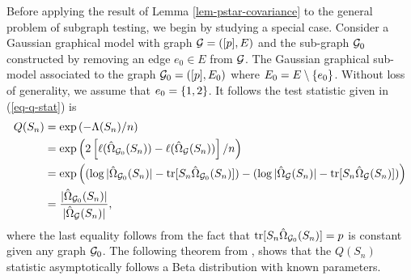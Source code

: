 Before applying the result of Lemma \ref{lem-pstar-covariance} to the general problem of subgraph testing, we begin by studying a special case. Consider a Gaussian graphical model with graph ${\mathcal{G}} = ([p], E)$ and the sub-graph ${\mathcal{G}}_0$ constructed by removing an edge $e_0 \in E$ from ${\mathcal{G}}$. The Gaussian graphical sub-model associated to the graph ${\mathcal{G}}_0 = ([p], E_0)$ where $E_0 = E \setminus {\left\{e_0\right\}}$. Without loss of generality, we assume that $e_0 = {\left\{1,2\right\}}$. It follows the test statistic given in (\ref{eq-q-stat}) is
\begin{align*}
    Q(S_n) 
    &= \exp\left(-\Lambda(S_n) / n\right)  \\
    &= \exp\left(2 \left[\ell(\hat\Omega_{{\mathcal{G}}_0}(S_n)) - \ell(\hat\Omega_{\mathcal{G}}(S_n))\right] / n\right) \\
    &= \exp\left(
        (\log |\hat\Omega_{{\mathcal{G}}_0}(S_n)| - {\textrm{tr}}[S_n\hat\Omega_{{\mathcal{G}}_0}(S_n)])
        -    
        (\log |\hat\Omega_{\mathcal{G}}(S_n)| - {\textrm{tr}}[S_n\hat\Omega_{\mathcal{G}}(S_n)])\right) \\
    &= \frac{|\hat\Omega_{{\mathcal{G}}_0}(S_n)|}{|\hat\Omega_{{\mathcal{G}}}(S_n)|},
\end{align*}
where the last equality follows from the fact that ${\textrm{tr}}[S_n\hat\Omega_{{\mathcal{G}}_0}(S_n)] = p$ is constant given any graph ${\mathcal{G}}_0$. The following theorem from \cite[Theorem 3.2]{eriksen1996tests}, shows that the $Q(S_n)$ statistic asymptotically follows a Beta distribution with known parameters.

